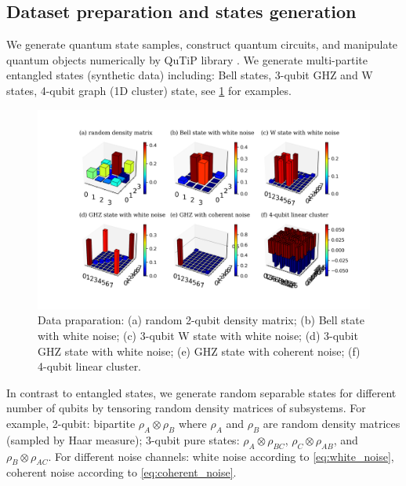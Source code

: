 \documentclass[
reprint,
aps,
pra,
floatfix,
]{revtex4-2}
\theoremstyle{plain}
\theoremstyle{definition}
\newcommand{\dm}{\rho}
\begin{document}
\subsection{Dataset preparation and states generation}\label{sec:data}
We generate quantum state samples, construct quantum circuits, and manipulate quantum objects numerically by QuTiP library \cite{johanssonQuTiPPythonFramework2013} \cite{liPulselevelNoisyQuantum2022}.
We generate multi-partite entangled states (synthetic data) including: Bell states, 3-qubit GHZ and W states, 4-qubit graph (1D cluster) state, see \cref{fig:sample_data} for examples.
\begin{figure}[!ht]
	\centering
	\includegraphics[width=.9\linewidth]{./Code/dataset_sample_3x2.png}
	\caption{Data praparation: (a) random 2-qubit density matrix; (b) Bell state with white noise; (c) 3-qubit W state with white noise; (d) 3-qubit GHZ state with white noise; (e) GHZ state with coherent noise; (f) 4-qubit linear cluster.}
	\label{fig:sample_data}
\end{figure}
In contrast to entangled states, we generate random separable states for different number of qubits by tensoring random density matrices of subsystems.
For example,
2-qubit: bipartite $\rho_A\otimes \rho_B$ where $\rho_A$ and $\rho_B$ are random density matrices (sampled by Haar measure);
3-qubit pure states: $\dm_A\otimes \dm_{BC}$, $\dm_C\otimes \dm_{AB}$, and $\dm_B\otimes \dm_{AC}$.
For different noise channels: white noise according to \cref{eq:white_noise}, coherent noise according to \cref{eq:coherent_noise}.
\end{document}
